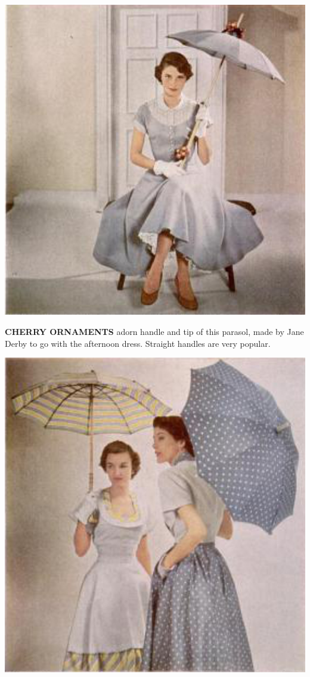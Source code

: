 \begin{minipage}{1.05\textwidth}
{\begin{minipage}[t]{0.87\textwidth}
\begin{minipage}[t]{0.41\textwidth}
\includegraphics[width=1.03\textwidth]{./images/parasol-06.jpg}\par%
\noindent \footnotesize\textbf{CHERRY ORNAMENTS} adorn handle and tip of this parasol, made by Jane Derby to go with the afternoon dress. Straight handles are very popular.
\end{minipage}\hspace{0.5cm}
\begin{minipage}[t]{0.4\textwidth}
   \includegraphics[width=1\textwidth]{./images/parasol-07.jpg}\par

\end{minipage}
\end{minipage}}
\end{minipage}
